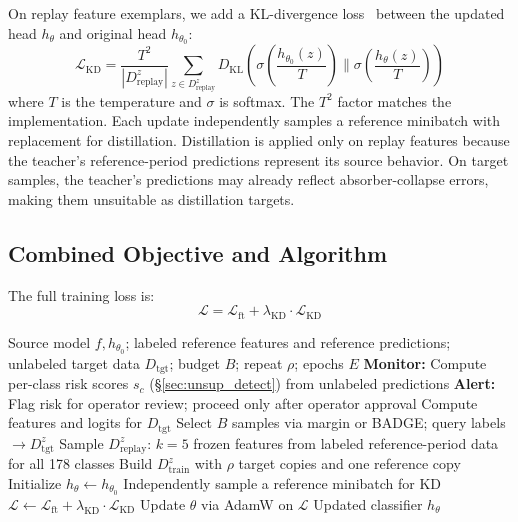 \documentclass[journal]{IEEEtran}
\newcommand{\ours}{CARE}  %
\begin{document}
On replay feature exemplars, we add a KL-divergence loss~\cite{hinton2015distilling} between the updated head $h_\theta$ and original head $h_{\theta_0}$:
\begin{equation}
  \mathcal{L}_{\text{KD}} = \frac{T^2}{|D_{\text{replay}}^z|} \!\sum_{z \in D_{\text{replay}}^z} D_{\text{KL}}\!\!\left(\sigma\!\!\left(\frac{h_{\theta_0}(z)}{T}\right) \!\Big\|\! \sigma\!\!\left(\frac{h_\theta(z)}{T}\right)\!\right)
\end{equation}
where $T$ is the temperature and $\sigma$ is softmax. The $T^2$ factor matches the implementation. Each update independently samples a reference minibatch with replacement for distillation.
Distillation is applied only on replay features because the teacher's reference-period predictions represent its source behavior.
On target samples, the teacher's predictions may already reflect absorber-collapse errors, making them unsuitable as distillation targets.

\subsection{Combined Objective and Algorithm}

The full training loss is:
\begin{equation}
  \mathcal{L} = \mathcal{L}_{\text{ft}} + \lambda_{\text{KD}} \cdot \mathcal{L}_{\text{KD}}
\end{equation}

\begin{algorithm}[t]
\caption{\ours{}: Collapse-Aware Repair}
\label{alg:care}
\begin{algorithmic}[1]
\REQUIRE Source model $f, h_{\theta_0}$; labeled reference features and reference predictions; unlabeled target data $D_{\text{tgt}}$; budget $B$; repeat $\rho$; epochs $E$
\STATE \textbf{Monitor:} Compute per-class risk scores $s_c$ (\S\ref{sec:unsup_detect}) from unlabeled predictions
\STATE \textbf{Alert:} Flag risk for operator review; proceed only after operator approval
\STATE Compute features and logits for $D_{\text{tgt}}$
\STATE Select $B$ samples via margin or BADGE; query labels $\to D_{\text{tgt}}^z$
\STATE Sample $D_{\text{replay}}^z$: $k{=}5$ frozen features from labeled reference-period data for all 178 classes
\STATE Build $D_{\text{train}}^z$ with $\rho$ target copies and one reference copy
\STATE Initialize $h_\theta \leftarrow h_{\theta_0}$
    \STATE Independently sample a reference minibatch for KD
    \STATE $\mathcal{L} \leftarrow \mathcal{L}_{\text{ft}} + \lambda_{\text{KD}} \cdot \mathcal{L}_{\text{KD}}$
    \STATE Update $\theta$ via AdamW on $\mathcal{L}$
  \ENDFOR
\ENDFOR
\RETURN Updated classifier $h_\theta$
\end{algorithmic}
\end{algorithm}
\end{document}
